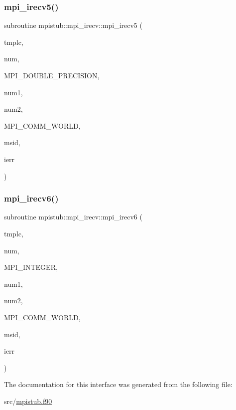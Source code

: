 \mbox{\label{interfacempistub_1_1mpi__irecv_aaf483c234206c1e29ee73f8112be8c02}} 
\subsubsection{\texorpdfstring{mpi\_irecv5()}{mpi\_irecv5()}}
{\footnotesize\ttfamily subroutine mpistub\+::mpi\+\_\+irecv\+::mpi\+\_\+irecv5 (\begin{DoxyParamCaption}\item[{double precision, dimension(\+:,\+:,\+:)}]{tmplc,  }\item[{}]{num,  }\item[{}]{M\+P\+I\+\_\+\+D\+O\+U\+B\+L\+E\+\_\+\+P\+R\+E\+C\+I\+S\+I\+ON,  }\item[{}]{num1,  }\item[{}]{num2,  }\item[{}]{M\+P\+I\+\_\+\+C\+O\+M\+M\+\_\+\+W\+O\+R\+LD,  }\item[{}]{msid,  }\item[{}]{ierr }\end{DoxyParamCaption})}

\mbox{\label{interfacempistub_1_1mpi__irecv_a275d9c269d4c86a48a5cbeb5f5a56fbf}} 
\subsubsection{\texorpdfstring{mpi\_irecv6()}{mpi\_irecv6()}}
{\footnotesize\ttfamily subroutine mpistub\+::mpi\+\_\+irecv\+::mpi\+\_\+irecv6 (\begin{DoxyParamCaption}\item[{integer, dimension(\+:)}]{tmplc,  }\item[{}]{num,  }\item[{}]{M\+P\+I\+\_\+\+I\+N\+T\+E\+G\+ER,  }\item[{}]{num1,  }\item[{}]{num2,  }\item[{}]{M\+P\+I\+\_\+\+C\+O\+M\+M\+\_\+\+W\+O\+R\+LD,  }\item[{}]{msid,  }\item[{}]{ierr }\end{DoxyParamCaption})}



The documentation for this interface was generated from the following file\+:\begin{DoxyCompactItemize}
\item 
src/\mbox{\hyperlink{mpistub_8f90}{mpistub.\+f90}}\end{DoxyCompactItemize}
